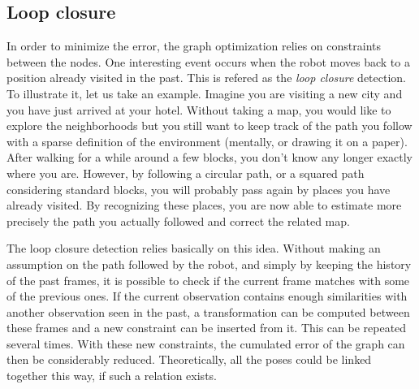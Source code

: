 \clearpage
\subsection{Loop closure}

In order to minimize the error, the graph optimization relies on constraints between the nodes. One interesting event occurs when the robot moves back to a position already visited in the past. This is refered as the \emph{loop closure} detection. To illustrate it, let us take an example. Imagine you are visiting a new city and you have just arrived at your hotel. Without taking a map, you would like to explore the neighborhoods but you still want to keep track of the path you follow with a sparse definition of the environment (mentally, or drawing it on a paper). After walking for a while around a few blocks, you don't know any longer exactly where you are. However, by following a circular path, or a squared path considering standard blocks, you will probably pass again by places you have already visited. By recognizing these places, you are now able to estimate more precisely the path you actually followed and correct the related map.

The loop closure detection relies basically on this idea. Without making an assumption on the path followed by the robot, and simply by keeping the history of the past frames, it is possible to check if the current frame matches with some of the previous ones. If the current observation contains enough similarities with another observation seen in the past, a transformation can be computed between these frames and a new constraint can be inserted from it. This can be repeated several times. With these new constraints, the cumulated error of the graph can then be considerably reduced. Theoretically, all the poses could be linked together this way, if such a relation exists. 

